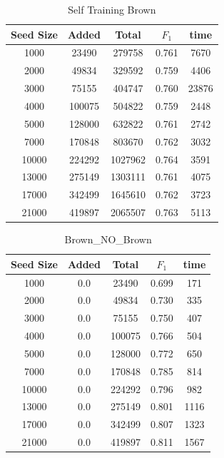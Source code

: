 \documentclass[journal, a4paper]{IEEEtran}
\begin{document}
	\begin{table}[!hbt]
		\begin{center}
		\caption{Self Training Brown}
		\label{tab:4}
		\begin{tabular}{|c|c|c|c|c|}
			\hline
			Seed Size & Added & Total & $F_{1}$ & time\\ \hline
			  1000  & 23490 & 279758 & 0.761 & 7670\\ \hline
			  2000  & 49834 & 329592 & 0.759 & 4406\\ \hline
			  3000  & 75155 & 404747 & 0.760 & 23876\\ \hline
			  4000  & 100075 & 504822 & 0.759 & 2448\\ \hline
			  5000  & 128000 & 632822 & 0.761 & 2742\\ \hline
			  7000  & 170848 & 803670 & 0.762 & 3032\\ \hline
			  10000  & 224292 & 1027962 & 0.764 & 3591\\ \hline
			  13000  & 275149 & 1303111 & 0.761 & 4075\\ \hline
			  17000  & 342499 & 1645610 & 0.762 & 3723\\ \hline
			  21000  & 419897 & 2065507 & 0.763 & 5113\\
			 \hline
		\end{tabular}
		\end{center}
		\vspace{-5mm}
	\end{table}
	
	\begin{table}[!hbt]
		\begin{center}
		\caption{Brown\_NO\_Brown}
		\label{tab:5}
		\begin{tabular}{|c|c|c|c|c|}
			\hline
			Seed Size & Added & Total & $F_{1}$ & time\\ \hline
			  1000  & 0.0 & 23490 & 0.699 & 171\\ \hline
			  2000  & 0.0 & 49834 & 0.730 & 335\\ \hline
			  3000  & 0.0 & 75155 & 0.750 & 407\\ \hline
			  4000  & 0.0 & 100075 & 0.766 & 504\\ \hline
			  5000  & 0.0 & 128000 & 0.772 & 650\\ \hline
			  7000  & 0.0 & 170848 & 0.785 & 814\\ \hline
			  10000  & 0.0 & 224292 & 0.796 & 982\\ \hline
			  13000  & 0.0 & 275149 & 0.801 & 1116\\ \hline
			  17000  & 0.0 & 342499 & 0.807 & 1323\\ \hline
			  21000  & 0.0 & 419897 & 0.811 & 1567\\
			 \hline
		\end{tabular}
		\end{center}
		\vspace{-5mm}
	\end{table}
	
\end{document}
